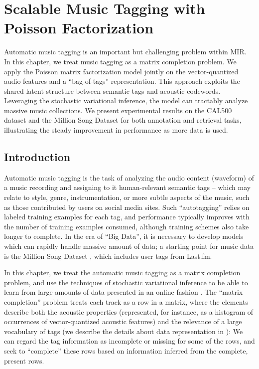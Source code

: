 
\chapter{Scalable Music Tagging with Poisson Factorization}\label{chpt:tagging}

Automatic music tagging is an important but challenging problem within \gls{MIR}. In this chapter, we treat music tagging as a matrix completion problem. We apply the Poisson matrix factorization model jointly on the vector-quantized audio features and a ``bag-of-tags'' representation. This approach exploits the shared latent structure between semantic tags and acoustic codewords. Leveraging the stochastic variational inference, the model can tractably analyze massive music collections. We present experimental results on the CAL500 dataset and the Million Song Dataset for both annotation and retrieval tasks, illustrating the steady improvement in performance as more data is used. 
%
\section{Introduction}\label{chpt:tagging:sec:intro}

Automatic music tagging is the task of analyzing the audio content (waveform) of a music recording and assigning to it human-relevant semantic tags \citep{Turnbull_SemanticAudio} -- which may relate to style, genre, instrumentation, or more subtle aspects of the music, such as those contributed by users on social media sites.  Such ``autotagging'' \citep{eck2007automatic} relies on labeled training examples for each tag, and performance typically improves with the number of training examples consumed, although training schemes also take longer to complete.  In the era of ``Big Data'', it is necessary to develop models which can rapidly handle massive amount of data; a starting point for music data is the Million Song Dataset \citep{bertin2011million}, which includes user tags from Last.fm.

In this chapter, we treat the automatic music tagging as a matrix completion problem, and use the 
techniques of stochastic variational inference to be able to learn from large amounts of data presented in an online fashion \citep{hoffman2013stochastic}. The ``matrix completion'' problem treats each track as a row in a matrix, where the elements describe both the acoustic properties (represented, for instance, as a histogram of occurrences of vector-quantized acoustic features) and the relevance of a large vocabulary of tags (we describe the details about data representation in ): We can regard the tag information as incomplete or missing for some of the rows, and seek to ``complete'' these rows based on information inferred from the complete, present rows.

